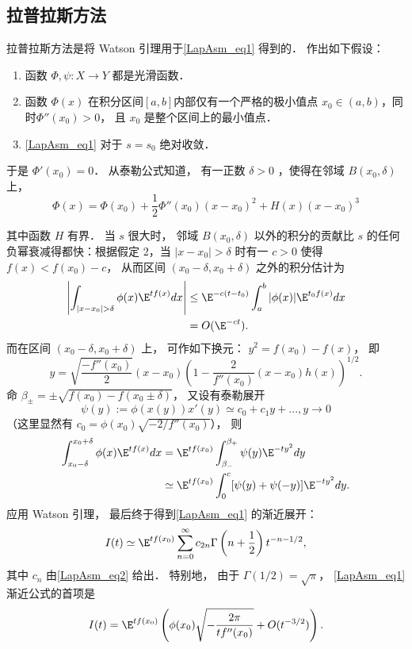 \subsection{拉普拉斯方法}
拉普拉斯方法是将 Watson 引理用于\autoref{LapAsm_eq1} 得到的． 作出如下假设：

\begin{enumerate}
\item 函数 $\Phi,\psi:X\to Y$ 都是光滑函数．

\item 函数 $\Phi(x)$ 在积分区间$[a,b]$内部仅有一个严格的极小值点 $x_0\in(a,b)$，同时$\Phi''(x_0)>0$， 且 $x_0$ 是整个区间上的最小值点．

\item \autoref{LapAsm_eq1} 对于 $s=s_0$ 绝对收敛．
\end{enumerate}

于是 $\Phi'(x_0)=0$． 从泰勒公式知道， 有一正数 $\delta>0$ ，使得在邻域 $B(x_0,\delta)$ 上， 
\[
  \Phi(x)=\Phi(x_0)+\frac{1}{2}\Phi''(x_0)(x-x_0)^2+H(x)(x-x_0)^3
\]

其中函数 $H$ 有界． 当 $s$ 很大时， 邻域 $B(x_0,\delta)$ 以外的积分的贡献比 $s$ 的任何负幂衰减得都快：根据假定 2，当 $|x-x_0|>\delta$ 时有一 $c>0$ 使得 $f(x)<f(x_0)-c$， 从而区间 $(x_0-\delta,x_0+\delta)$ 之外的积分估计为
$$
\begin{aligned}
\left|\int_{|x-x_0|>\delta}\phi(x)\E^{tf(x)}dx\right|
&\leq \E^{-c(t-t_0)}\int_a^b|\phi(x)|\E^{t_0f(x)}dx\\
&=O(\E^{-ct}).
\end{aligned}
$$
而在区间 $(x_0-\delta,x_0+\delta)$ 上， 可作如下换元： $y^2=f(x_0)-f(x)$， 即
$$
y=\sqrt{\frac{-f''(x_0)}{2}}(x-x_0)\left(1-\frac{2}{f''(x_0)}(x-x_0)h(x)\right)^{1/2}.
$$
命 $\beta_{\pm}=\pm\sqrt{f(x_0)-f(x_0\pm\delta)}$， 又设有泰勒展开
\begin{equation}\label{LapAsm_eq2}
\psi(y):=\phi(x(y))x'(y)\simeq c_0+c_1y+...,y\to 0
\end{equation}
（这里显然有 $c_0=\phi(x_0)\sqrt{-2/f''(x_0)}$）， 则
$$
\begin{aligned}
\int_{x_0-\delta}^{x_0+\delta}\phi(x)\E^{tf(x)}dx
&=\E^{tf(x_0)}\int_{\beta_{-}}^{\beta_+}\psi(y)\E^{-ty^2}dy\\
&\simeq\E^{tf(x_0)}\int_{0}^{c}[\psi(y)+\psi(-y)]\E^{-ty^2}dy.
\end{aligned}
$$
应用 Watson 引理， 最后终于得到\autoref{LapAsm_eq1} 的渐近展开：
\begin{equation}\label{LapAsm_eq3}
I(t)\simeq \E^{tf(x_0)}\sum_{n=0}^\infty c_{2n}\Gamma\left(n+\frac{1}{2}\right)t^{-n-1/2},
\end{equation}
其中 $c_n$ 由\autoref{LapAsm_eq2} 给出． 特别地， 由于 $\Gamma(1/2)=\sqrt{\pi}$， \autoref{LapAsm_eq1} 渐近公式的首项是
$$
I(t)=\E^{tf(x_0)}\left(\phi(x_0)\sqrt{-\frac{2\pi}{tf''(x_0)}}+O(t^{-3/2})\right).
$$

